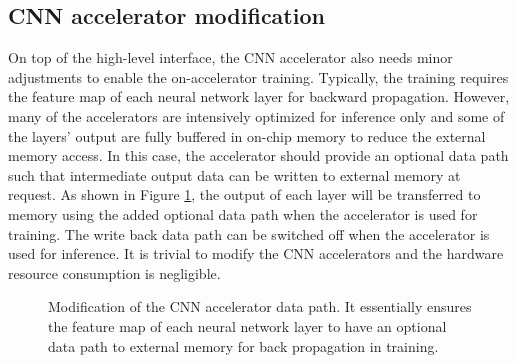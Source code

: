 \subsection{CNN accelerator modification}
On top of the high-level interface, the CNN accelerator also needs 
minor adjustments to enable the on-accelerator training. 
Typically, the training requires the feature map of each neural 
network layer for backward propagation. However, many of the accelerators 
are intensively optimized for inference only and some of the layers’ output 
are fully buffered in on-chip memory to reduce the external memory access. 
In this case, the accelerator should provide an optional data path such that 
intermediate output data can be written to external memory at request.
As shown in Figure \ref{fig:change_of_accelerator}, the output of each layer 
will be transferred to memory using the added optional data path 
when the accelerator is used for training. The write back data path 
can be switched off when the accelerator is used for inference. 
It is trivial to modify the CNN accelerators and the hardware
resource consumption is negligible.

\begin{figure}
        \caption{Modification of the CNN accelerator data path. It essentially
ensures the feature map of each neural network layer to have an optional data path 
to external memory for back propagation in training.}
        \label{fig:change_of_accelerator}
        \vspace{-1em}
\end{figure}


